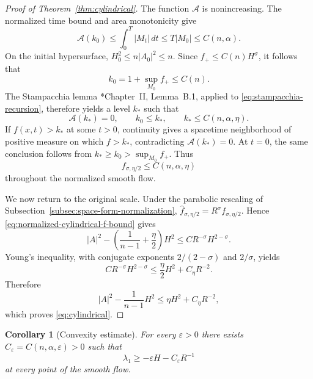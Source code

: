 \documentclass[11pt,reqno]{amsart}
\newtheorem{corollary}[proposition]{Corollary}
\theoremstyle{definition}
\theoremstyle{remark}
\numberwithin{equation}{section}
\begin{document}
\begin{proof}[Proof of Theorem~\ref{thm:cylindrical}]
The function $\mathcal A$ is nonincreasing.  The normalized time bound and
area monotonicity give
\begin{equation*}
 \mathcal A(k_0)
 \leq
 \int_0^T|M_t|\,dt
 \leq
 T|M_0|
 \leq
 C(n,\alpha).
\end{equation*}
On the initial hypersurface, $H_0^2\leq n|A_0|^2\leq n$.  Since
$f_+\leq C(n)H^\sigma$, it follows that
\begin{equation*}
 k_0
 =1+\sup_{M_0}f_+
 \leq C(n).
\end{equation*}
The Stampacchia lemma
\cite{KS80}*{Chapter~II, Lemma~B.1}, applied to
\eqref{eq:stampacchia-recursion}, therefore yields a level $k_*$ such that
\begin{equation*}
 \mathcal A(k_*)=0,
 \qquad
 k_0\leq k_*,
 \qquad
 k_*\leq C(n,\alpha,\eta).
\end{equation*}
If $f(x,t)>k_*$ at some $t>0$, continuity gives a spacetime neighborhood
of positive measure on which $f>k_*$, contradicting
$\mathcal A(k_*)=0$.  At $t=0$, the same conclusion follows from
$k_*\geq k_0>\sup_{M_0}f_+$.  Thus
\begin{equation}\label{eq:normalized-cylindrical-f-bound}
 f_{\sigma,\eta/2}
 \leq C(n,\alpha,\eta)
\end{equation}
throughout the normalized smooth flow.

We now return to the original scale.  Under the parabolic rescaling of
Subsection~\ref{subsec:space-form-normalization}, $ \widehat f_{\sigma,\eta/2}
 =R^\sigma f_{\sigma,\eta/2}$.  
Hence \eqref{eq:normalized-cylindrical-f-bound} gives
\begin{equation*}
 |A|^2
 -\left(\frac1{n-1}+\frac\eta2\right)H^2
 \leq
 C R^{-\sigma}H^{2-\sigma}.
\end{equation*}
Young's inequality, with conjugate exponents
$2/(2-\sigma)$ and $2/\sigma$, yields
\begin{equation*}
 C R^{-\sigma}H^{2-\sigma}
 \leq
 \frac\eta2 H^2+C_\eta R^{-2}.
\end{equation*}
Therefore
\begin{equation*}
 |A|^2-\frac1{n-1}H^2
 \leq
 \eta H^2+C_\eta R^{-2},
\end{equation*}
which proves \eqref{eq:cylindrical}.
\end{proof}


\begin{corollary}[Convexity estimate]\label{cor:convexity}
For every $\varepsilon>0$ there exists
$C_\varepsilon=C(n,\alpha,\varepsilon)>0$ such that
\begin{equation}\label{eq:convexity-estimate}
 \lambda_1\geq-\varepsilon H-C_\varepsilon R^{-1}
\end{equation}
at every point of the smooth flow.
\end{corollary}
\end{document}
